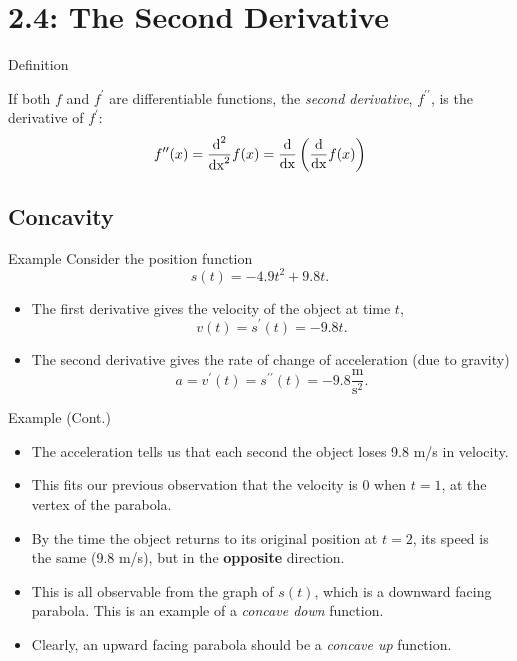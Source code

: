\documentclass[Lecture.tex]{subfiles}
\begin{document}
\section{2.4: The Second Derivative}
\begin{frame}{Definition}
  \begin{defn}
    If both $f$ and $f^\prime$ are differentiable functions, the {\it second derivative}, $f^{\prime\prime}$, is the derivative of $f^\prime$:
    $$f^{\prime\prime}(x) = \frac{\operatorname{d}^2}{\operatorname{dx}^2}f(x) = \frac{\operatorname{d}}{\operatorname{dx}}\left(\frac{\operatorname{d}}{\operatorname{dx}} f(x)\right)$$
  \end{defn}
\end{frame}

\subsection{Concavity}

\begin{frame}{Example}
  Consider the position function 
  $$s(t) = -4.9t^2 + 9.8t.$$
  \begin{itemize}
  \item<2->
    The first derivative gives the velocity of the object at time $t$,
    $$v(t) = s^\prime(t) = -9.8t.$$
  \item<3->
    The second derivative gives the rate of change of acceleration (due to gravity)
    $$a = v^\prime(t) = s^{\prime\prime}(t) = -9.8 \frac{\text{m}}{\text{s}^2}.$$
  \end{itemize}
\end{frame}

\begin{frame}{Example (Cont.)}
  \begin{itemize}
  \item<1->
    The acceleration tells us that each second the object loses 9.8 m/s in velocity.
  \item<2->
    This fits our previous observation that the velocity is 0 when $t = 1$, at the vertex of the parabola.
  \item<3->
    By the time the object returns to its original position at $t = 2$, its speed is the same (9.8 m/s), but in the {\bf opposite} direction.
  \item<4->
    This is all observable from the graph of $s(t)$, which is a downward facing parabola.
    This is an example of a {\it concave down} function.
  \item<5->
    Clearly, an upward facing parabola should be a {\it concave up} function.
  \end{itemize}
\end{frame}
\end{document}
